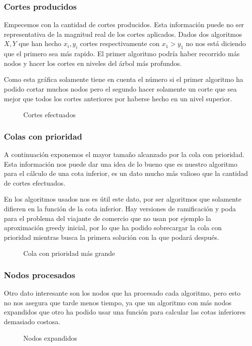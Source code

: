 \subsubsection{Cortes producidos}
Empecemos con la cantidad de cortes producidos. Esta información puede no ser representativa de la
magnitud real de los cortes aplicados. Dados dos algoritmos $X,Y$ que han hecho $x_i,y_i$ cortes
respectivamente con $x_1>y_1$ no nos está diciendo que el primero sea más rapido.
El primer algoritmo podría haber recorrido más nodos y hacer los cortes en niveles del árbol más profundos. 

Como esta gráfica solamente tiene en cuenta el número si el primer algoritmo ha podido 
cortar muchos nodos pero el segundo hacer solamente un corte que sea mejor que todos los cortes
anteriores por haberse hecho en un nivel superior.
 
\begin{figure}[H]
    \centering
    \caption{Cortes efectuados}
\end{figure}


\subsubsection{Colas con prioridad}
A continuación exponemos el mayor tamaño alcanzado por la cola con prioridad.
Esta información nos puede dar una idea de lo bueno que es nuestro algoritmo para el cálculo
de una cota inferior, es un dato mucho más valioso que la cantidad de cortes efectuados.

En los algoritmos usados nos es útil este dato, por ser algoritmos que solamente difieren en
la función de la cota inferior. Hay versiones de ramificación y poda para el problema del viajante
de comercio que no usan por ejemplo la aproximación greedy inicial, por lo que ha podido 
sobrecargar la cola con prioridad mientras busca la primera solución con la que podará después.

\begin{figure}[H]
    \centering
    \caption{Cola con prioridad más grande}
\end{figure}


\subsubsection{Nodos procesados}
Otro dato interesante son los nodos que ha procesado cada algoritmo, pero esto no nos asegura
que tarde menos tiempo, ya que un algoritmo con más nodos expandidos que otro ha podido usar una
función para calcular las cotas inferiores demasiado costosa.
\begin{figure}[H]
    \centering
    \caption{Nodos expandidos}
\end{figure}



